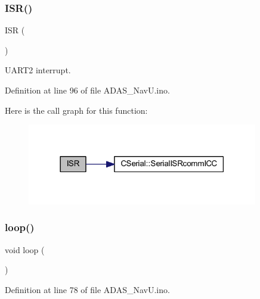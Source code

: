 \subsubsection{\texorpdfstring{I\+S\+R()}{ISR()}\hspace{0.1cm}{\footnotesize\ttfamily [2/2]}}
{\footnotesize\ttfamily I\+SR (\begin{DoxyParamCaption}\item[{U\+S\+A\+R\+T2\+\_\+\+R\+X\+\_\+vect}]{ }\end{DoxyParamCaption})}



U\+A\+R\+T2 interrupt. 



Definition at line 96 of file A\+D\+A\+S\+\_\+\+Nav\+U.\+ino.

Here is the call graph for this function\+:
\nopagebreak
\begin{figure}[H]
\begin{center}
\leavevmode
\includegraphics[width=285pt]{_a_d_a_s___nav_u_8ino_a63a86aad9ba2e355fe6380da553f554e_cgraph}
\end{center}
\end{figure}
\mbox{\label{_a_d_a_s___nav_u_8ino_afe461d27b9c48d5921c00d521181f12f}} 
\subsubsection{\texorpdfstring{loop()}{loop()}}
{\footnotesize\ttfamily void loop (\begin{DoxyParamCaption}{ }\end{DoxyParamCaption})}



Definition at line 78 of file A\+D\+A\+S\+\_\+\+Nav\+U.\+ino.

